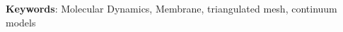 \begin{latin}
%
%
% 





\bigskip\noindent\textbf{Keywords}:
Molecular Dynamics, Membrane, triangulated mesh, continuum models

\end{latin}
